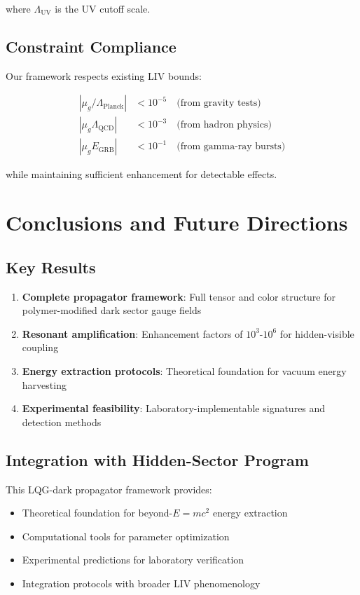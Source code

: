 \documentclass[12pt]{article}
\begin{document}
where $\Lambda_{\text{UV}}$ is the UV cutoff scale.

\subsection{Constraint Compliance}

Our framework respects existing LIV bounds:

\begin{align}
|\mu_g/\Lambda_{\text{Planck}}| &< 10^{-5} \quad \text{(from gravity tests)} \\
|\mu_g \Lambda_{\text{QCD}}| &< 10^{-3} \quad \text{(from hadron physics)} \\
|\mu_g E_{\text{GRB}}| &< 10^{-1} \quad \text{(from gamma-ray bursts)}
\end{align}

while maintaining sufficient enhancement for detectable effects.

\section{Conclusions and Future Directions}

\subsection{Key Results}

\begin{enumerate}
\item \textbf{Complete propagator framework}: Full tensor and color structure for polymer-modified dark sector gauge fields
\item \textbf{Resonant amplification}: Enhancement factors of $10^3$-$10^6$ for hidden-visible coupling
\item \textbf{Energy extraction protocols}: Theoretical foundation for vacuum energy harvesting
\item \textbf{Experimental feasibility}: Laboratory-implementable signatures and detection methods
\end{enumerate}

\subsection{Integration with Hidden-Sector Program}

This LQG-dark propagator framework provides:

\begin{itemize}
\item Theoretical foundation for beyond-$E=mc^2$ energy extraction
\item Computational tools for parameter optimization
\item Experimental predictions for laboratory verification
\item Integration protocols with broader LIV phenomenology
\end{itemize}
\end{document}
